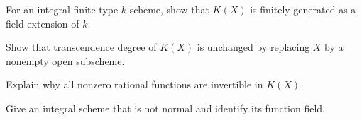 \begin{exercise}\label{exer:vi27-23}For an integral finite-type $k$-scheme, show that $K(X)$ is finitely generated as a field extension of $k$.\end{exercise}

\begin{exercise}\label{exer:vi27-24}Show that transcendence degree of $K(X)$ is unchanged by replacing $X$ by a nonempty open subscheme.\end{exercise}

\begin{exercise}\label{exer:vi27-25}Explain why all nonzero rational functions are invertible in $K(X)$.\end{exercise}

\begin{exercise}\label{exer:vi27-26}Give an integral scheme that is not normal and identify its function field.\end{exercise}
